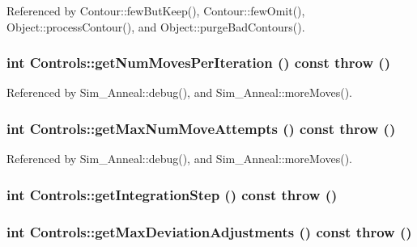 Referenced by Contour::fewButKeep(), Contour::fewOmit(), Object::processContour(), and Object::purgeBadContours().\hypertarget{classControls_a3748a625808c17247692cd9c8d5ca4c}{
\subsubsection[getNumMovesPerIteration]{\setlength{\rightskip}{0pt plus 5cm}int Controls::getNumMovesPerIteration () const  throw ()}}
\label{classControls_a3748a625808c17247692cd9c8d5ca4c}




Referenced by Sim\_\-Anneal::debug(), and Sim\_\-Anneal::moreMoves().\hypertarget{classControls_c1bb853f9584201b07822e6c44e73f1a}{
\subsubsection[getMaxNumMoveAttempts]{\setlength{\rightskip}{0pt plus 5cm}int Controls::getMaxNumMoveAttempts () const  throw ()}}
\label{classControls_c1bb853f9584201b07822e6c44e73f1a}




Referenced by Sim\_\-Anneal::debug(), and Sim\_\-Anneal::moreMoves().\hypertarget{classControls_68df257c4251022461ab172c787d5242}{
\subsubsection[getIntegrationStep]{\setlength{\rightskip}{0pt plus 5cm}int Controls::getIntegrationStep () const  throw ()}}
\label{classControls_68df257c4251022461ab172c787d5242}


\hypertarget{classControls_26ba220025ff09c85dcdf9f8b6321b99}{
\subsubsection[getMaxDeviationAdjustments]{\setlength{\rightskip}{0pt plus 5cm}int Controls::getMaxDeviationAdjustments () const  throw ()}}
\label{classControls_26ba220025ff09c85dcdf9f8b6321b99}


